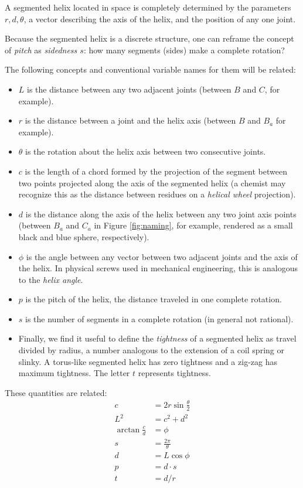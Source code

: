 \documentclass{svproc}
\begin{document}
A segmented helix located in space is completely determined by
the parameters $r,d,\theta$,
a vector describing the axis
of the helix, and the position of any one joint.

Because the segmented helix is a discrete structure, one can reframe the concept of {\em pitch} as {\em sidedness $s$}:
how many segments (sides)
make a complete rotation?

The following concepts and conventional variable names for them will be related:
\begin{itemize}
\item $L$ is the distance between any two adjacent joints (between $B$ and $C$, for example).
  \item $r$ is the distance between a joint and the helix axis (between $B$ and $B_a$ for example).
  \item $\theta$ is the rotation about the helix axis between two consecutive joints.
  \item $c$ is the length of a chord formed by the projection of the segment between two points projected along the axis of the segmented helix (a chemist may recognize this as the distance between residues on a {\em helical wheel} projection).
  \item $d$ is the distance along the axis of the helix between any two joint axis points (between $B_a$ and $C_a$ in Figure \ref{fig:naming}, for example, rendered as a small black and blue
    sphere, respectively).
\item $\phi$ is the angle between any vector between two adjacent joints and the axis of the helix. In physical screws used in mechanical engineering, this is analogous to the {\em helix angle}.
  \item $p$ is the pitch of the helix, the distance traveled in one complete rotation.
  \item $s$ is the number of segments in a complete rotation (in general not rational).
\item  Finally, we find it useful to define the {\em tightness} of a segmented helix
as travel divided by radius, a number
analogous to the extension of a coil spring or slinky.
A torus-like segmented helix has zero tightness and a zig-zag has
maximum tightness. The letter $t$ represents tightness.

  \end{itemize}
These quantities are related:
\begin{align}
    c &= 2r\sin{\frac{\theta}{2}} \\
    L^2 &= c^2+d^2  \\
    \arctan{\frac{c}{d}}  &= \phi \\
    s &= \frac{2 \pi}{\theta} \\
    d &= L \cos{\phi} \\
    p &= d \cdot s \\
    t &= d / r
\end{align}
\end{document}
